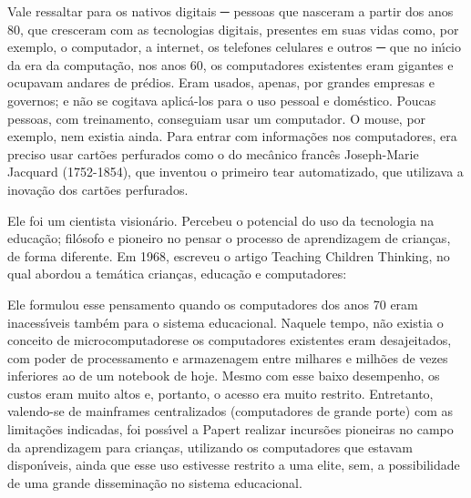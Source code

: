 \documentclass[
12pt,		%
openright,	%
twoside,  %
a4paper,			%
chapter=TITLE,		%
english,			%
french,				%
spanish,			%
brazil				%
]{USPSC-classe/USPSC_RedarTex}
\begin{document}
Vale ressaltar para os nativos digitais ─ pessoas que nasceram a partir dos anos 80, que cresceram com as tecnologias digitais, presentes em suas vidas como, por exemplo, o computador,  a internet, os telefones celulares e outros ─ que no in\'{\i}cio da era da computa\c{c}\~ao, nos anos 60, os computadores existentes eram gigantes e ocupavam andares de pr\'edios. Eram usados, apenas, por grandes empresas e governos; e n\~ao se cogitava aplic\'a-los para o uso pessoal e dom\'estico. Poucas pessoas, com treinamento, conseguiam usar um computador. O mouse, por exemplo, nem existia ainda. Para entrar com informa\c{c}\~oes nos computadores, era preciso usar cart\~oes perfurados como o do mec\^anico franc\^es Joseph-Marie Jacquard (1752-1854), que inventou o primeiro tear automatizado,  que  utilizava a inova\c{c}\~ao dos cart\~oes perfurados.








Ele foi um cientista vision\'ario. Percebeu o potencial do uso da tecnologia na educa\c{c}\~ao; fil\'osofo e pioneiro no pensar o processo de aprendizagem de crian\c{c}as, de forma diferente. Em 1968, escreveu o artigo \textquotedbl Teaching Children Thinking\textquotedbl , no qual abordou a tem\'atica crian\c{c}as, educa\c{c}\~ao e computadores:









\noindent\begin{center}\mbox{\centering{}}\end{center}


Ele formulou esse pensamento quando os computadores dos anos 70 eram inacess\'{\i}veis tamb\'em para o sistema educacional. Naquele tempo, n\~ao existia o conceito de \textquotedbl microcomputadores\textquotedbl  e os computadores existentes eram desajeitados, com poder de processamento e armazenagem entre milhares e milh\~oes de vezes inferiores ao de um notebook de hoje. Mesmo com esse baixo desempenho, os custos eram muito altos e, portanto, o acesso era muito restrito. Entretanto, valendo-se de mainframes centralizados (computadores de grande porte) com as limita\c{c}\~oes indicadas, foi poss\'{\i}vel a Papert realizar incurs\~oes pioneiras no campo da aprendizagem para crian\c{c}as, utilizando os computadores que estavam dispon\'{\i}veis, ainda que esse uso estivesse restrito a uma elite, sem, a possibilidade de uma grande dissemina\c{c}\~ao no sistema educacional.
\end{document}
